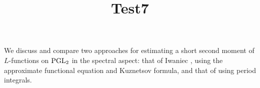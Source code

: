 \documentclass[reqno]{amsart} 
\title{Test7}
\numberwithin{equation}{section}
\numberwithin{theorem}{section}
\begin{document}
\maketitle
\tableofcontents


We discuss and compare two approaches for estimating a short second moment of $L$-functions on $\operatorname{PGL}_2$ in the spectral aspect: that of Iwaniec \cite{Iwaniec1992}, using the approximate functional equation and Kuznetsov formula, and that of \cite{2021arXiv210915230N} using period integrals.




{} 
\end{document}

